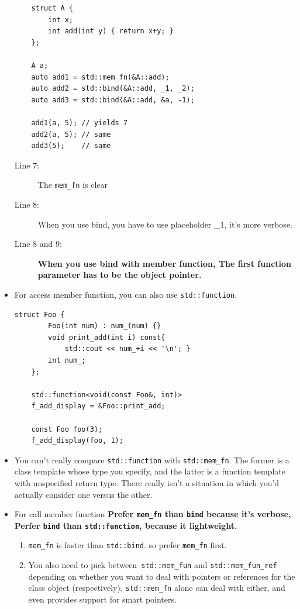 \documentclass[a4paper,11pt,twoside]{book}
\begin{document}
\begin{itemize}
\begin{lstlisting}
	struct A { 
		int x;
		int add(int y) { return x+y; }
	};
	
	A a;
	auto add1 = std::mem_fn(&A::add);
	auto add2 = std::bind(&A::add, _1, _2);
	auto add3 = std::bind(&A::add, &a, -1);
	
	add1(a, 5); // yields 7
	add2(a, 5); // same
	add3(5);    // same
\end{lstlisting}
\begin{description}
	\item[Line 7:] The \texttt{mem\_fn} is clear
	\item[Line 8:] When you use bind, you have to use placeholder \_1, it's more verbose.
	\item[Line 8 and 9:] \textbf{When you use bind with member function, The first function parameter has to be the object pointer.}
\end{description}

\item For access member function, you can also use \texttt{std::function}.

\begin{lstlisting}[numbers=none]
	struct Foo {
		Foo(int num) : num_(num) {}
		void print_add(int i) const{
			std::cout << num_+i << '\n'; }
		int num_;
	};
	
	std::function<void(const Foo&, int)> 
	f_add_display = &Foo::print_add;
	
	const Foo foo(3);
	f_add_display(foo, 1); 	
\end{lstlisting}		

\item You can't really compare \texttt{std::function} with \texttt{std::mem\_fn}. The former is a class template whose type you specify, and the latter is a function template with unspecified return type. There really isn't a situation in which you'd actually consider one versus the other.

\item For call member function \textbf{Prefer \texttt{mem\_fn} than \texttt{bind} because it's verbose, Perfer \texttt{bind}  than \texttt{std::function}, because it lightweight.}

\begin{enumerate}
	\item \texttt{mem\_fn} is faster than \texttt{std::bind}.  so prefer \texttt{mem\_fn} first.
	
	\item You also need to pick between\texttt{ std::mem\_fun} and \texttt{std::mem\_fun\_ref} depending on whether you want to deal with pointers or references for the class object (respectively). \texttt{std::mem\_fn} alone can deal with either, and even provides support for smart pointers.
\end{enumerate}




\end{itemize}
\end{document}

